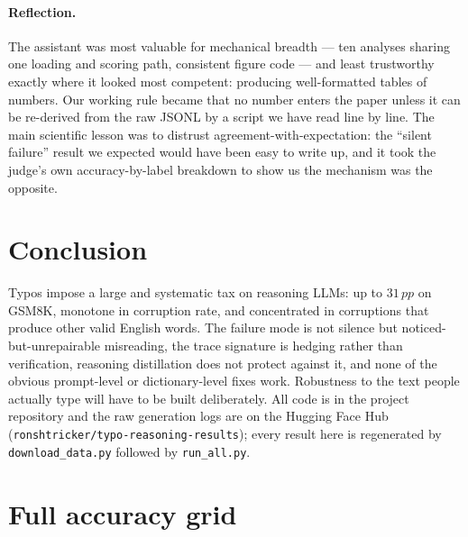 \documentclass[11pt]{article}
\newcommand{\pp}{\,pp}
\begin{document}
\paragraph{Reflection.} The assistant was most valuable for mechanical breadth
--- ten analyses sharing one loading and scoring path, consistent figure code
--- and least trustworthy exactly where it looked most competent: producing
well-formatted tables of numbers. Our working rule became that no number enters
the paper unless it can be re-derived from the raw JSONL by a script we have
read line by line. The main scientific lesson was to distrust
agreement-with-expectation: the ``silent failure'' result we expected would have
been easy to write up, and it took the judge's own accuracy-by-label breakdown
to show us the mechanism was the opposite.

\section{Conclusion}

Typos impose a large and systematic tax on reasoning LLMs: up to $31\pp$ on
GSM8K, monotone in corruption rate, and concentrated in corruptions that produce
other valid English words. The failure mode is not silence but
noticed-but-unrepairable misreading, the trace signature is hedging rather than
verification, reasoning distillation does not protect against it, and none of
the obvious prompt-level or dictionary-level fixes work. Robustness to the text
people actually type will have to be built deliberately. All code is in the
project repository and the raw generation logs are on the Hugging Face Hub
(\texttt{ronshtricker/typo-reasoning-results}); every result here is regenerated
by \texttt{download\_data.py} followed by \texttt{run\_all.py}.



\clearpage
\onecolumn
\appendix

\section{Full accuracy grid}
\label{app:acc}
\begin{table}[!ht]
\centering\small

\caption{Answered-only accuracy (\%), number of answered questions ($n_a$), and
mean generated tokens, for all configurations and datasets.}
\label{tab:fullacc}
\end{table}
\end{document}
